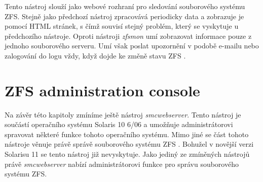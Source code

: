 Tento nástroj slouží jako webové rozhraní pro sledování souborového systému ZFS. Stejně jako předchozí nástroj zpracovává periodicky data a zobrazuje je pomocí HTML stránek, s čímž souvisí stejný problém, který se vyskytuje u předchozího nástroje. Oproti nástroji \emph{zfsmon} umí zobrazovat informace pouze z jednoho souborového serveru. Umí však poslat upozornění v podobě e-mailu nebo zalogování do logu vždy, když dojde ke změně stavu ZFS \cite{zfswatcher}.
\section{ZFS administration console}
Na závěr této kapitoly zmíníme ještě nástroj \emph{smcwebserver}. Tento nástroj je součástí operačního systému Solaris 10 6/06 a umožňuje administrátorovi spravovat některé funkce tohoto operačního systému. Mimo jiné se část tohoto nástroje věnuje právě správě souborového systému ZFS \cite{smc}. Bohužel v novější verzi Solarisu 11 se tento nástroj již nevyskytuje. Jako jediný ze zmíněných nástrojů právě \emph{smcwebserver} nabízí administrátorovi funkce pro správu souborového systému ZFS. 